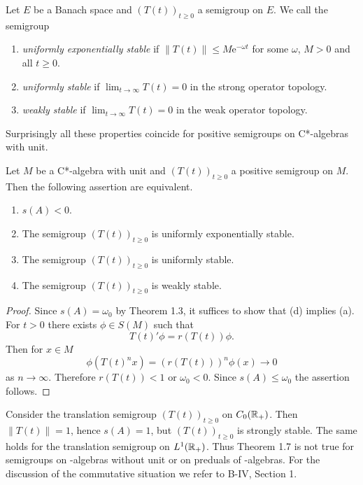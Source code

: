 \begin{definition}\label{def:d4-1.6}
Let $E$ be a Banach space and $(T(t))_{t \geq 0}$ a semigroup on $E$.
We call the semigroup
\begin{enumerate}[\upshape (i)]
\item 
\emph{uniformly exponentially stable} if $\|T(t)\| \leq M\mathrm{e}^{-\omega t}$ for some $\omega$, $M > 0$ and all $t \geq 0$.

\item 
\emph{uniformly stable} if $\lim_{t \to \infty} T(t) = 0$ in the strong operator topology.

\item 
\emph{weakly stable} if $\lim_{t \to \infty} T(t) = 0$ in the weak operator topology.
\end{enumerate}
\end{definition}
Surprisingly all these properties coincide for positive semigroups on C*-algebras with unit.
\begin{theorem}\label{thm:d4-1.7}
Let $M$ be a C*-algebra with unit and $(T(t))_{t \geq 0}$ a positive semigroup on $M$.
Then the following assertion are equivalent.
\begin{enumerate}[\upshape (a)]
\item 
$s(A) < 0$.

\item 
The semigroup $(T(t))_{t \geq 0}$ is uniformly exponentially stable.

\item 
The semigroup $(T(t))_{t \geq 0}$ is uniformly stable.

\item 
The semigroup $(T(t))_{t \geq 0}$ is weakly stable.

\end{enumerate}
\end{theorem}
\begin{proof}
Since $s(A) = \omega_{0}$ by Theorem 1.3, it suffices to show that (d) implies (a).
For $t > 0$ there exists $\phi \in S(M)$ such that
\[
    T(t)'\phi = r(T(t))\phi .
\]
Then for $x \in M$
\[
    \phi(T(t)^{n}x) = (r(T(t)))^{n} \phi(x) \to 0
\]
as $n \to \infty$.
Therefore $r(T(t)) < 1$ or $\omega_{0} < 0$.
Since $s(A) \leq \omega_{0}$ the assertion follows.
\end{proof}
\begin{remark}\label{rem:d4-1.8}
Consider the translation semigroup $(T(t))_{t \geq 0}$ on $C_{0}(\mathbb{R}_{+})$. 
Then $\|T(t)\| = 1$, hence $s(A) = 1$, but $(T(t))_{t \geq 0}$ is strongly stable.
The same holds for the translation semigroup on $L^1(\mathbb{R}_{+})$.
Thus Theorem 1.7 is not true for semigroups on \CA-algebras without unit or on preduals of \WA-algebras.
For the discussion of the commutative situation we refer to B-IV, Section 1.
\end{remark}
